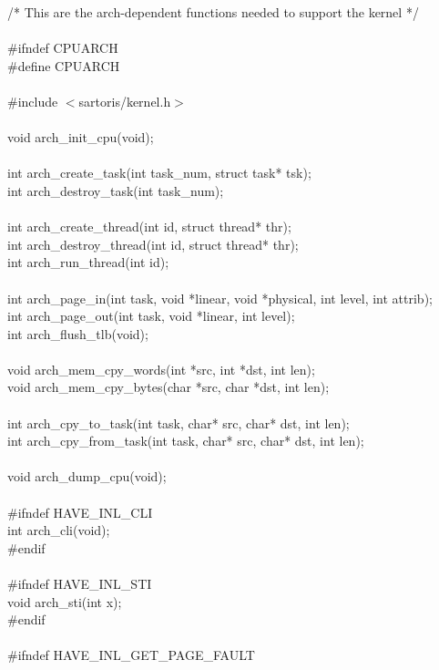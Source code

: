 \documentclass[11pt, letterpaper, twoside, english]{book}
\begin{document}
\begin{sf} \noindent /* This are the arch-dependent functions needed to support the kernel */ \\
\\
\#ifndef CPUARCH \\
\#define CPUARCH \\
\\
\#include $<$sartoris/kernel.h$>$ \\
\\
void arch\_init\_cpu(void); \\
\\
int arch\_create\_task(int task\_num, struct task* tsk); \\
int arch\_destroy\_task(int task\_num); \\
\\
int arch\_create\_thread(int id, struct thread* thr); \\
int arch\_destroy\_thread(int id, struct thread* thr); \\
int arch\_run\_thread(int id); \\
\\
int arch\_page\_in(int task, void *linear, void *physical, int level, int attrib); \\
int arch\_page\_out(int task, void *linear, int level); \\
int arch\_flush\_tlb(void); \\
\\
void arch\_mem\_cpy\_words(int *src, int *dst, int len); \\
void arch\_mem\_cpy\_bytes(char *src, char *dst, int len); \\
\\
int arch\_cpy\_to\_task(int task, char* src, char* dst, int len); \\
int arch\_cpy\_from\_task(int task, char* src, char* dst, int len); \\
\\
void arch\_dump\_cpu(void); \\
\\
\#ifndef HAVE\_INL\_CLI \\
int arch\_cli(void); \\
\#endif \\
\\
\#ifndef HAVE\_INL\_STI \\
void arch\_sti(int x); \\
\#endif \\
\\
\#ifndef HAVE\_INL\_GET\_PAGE\_FAULT \\

\end{sf}
\end{document}
